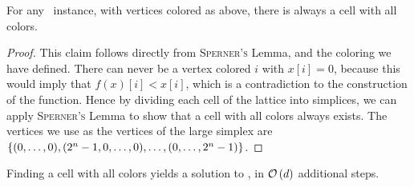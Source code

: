 \begin{claim}
    For any \Tarskistar\ instance, with vertices colored as above, there is always a cell with all colors.
\end{claim}
\begin{proof}
    This claim follows directly from \textsc{Sperner's} Lemma, and the coloring we have defined. There can never be a vertex colored $i$ with $x[i] = 0$, because this would imply that $f(x)[i] < x[i]$, which is a contradiction to the construction of the function. Hence by dividing each cell of the lattice into simplices, we can apply \textsc{Sperner's} Lemma to show that a cell with all colors always exists. The vertices we use as the vertices of the large simplex are $\left\{(0, \dots, 0), (2^n - 1, 0, \dots, 0), \dots, (0, \dots, 2^n - 1)\right\}$.
\end{proof}
\begin{claim}
    Finding a cell with all colors yields a solution to \Tarskistar, in $\mathcal{O}\left(d\right)$ additional steps.
\end{claim}
